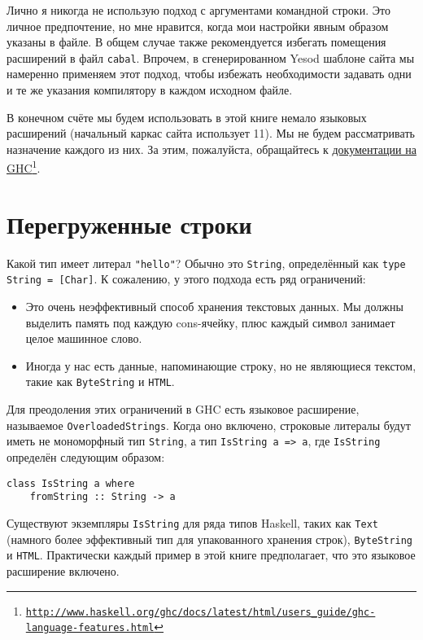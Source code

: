 Лично я никогда не использую подход с аргументами командной строки. Это личное предпочтение, но мне нравится, когда мои настройки явным образом указаны в файле. В общем случае также рекомендуется избегать помещения расширений в файл \texttt{cabal}. Впрочем, в сгенерированном Yesod шаблоне сайта  мы намеренно применяем этот подход, чтобы избежать необходимости задавать одни и те же указания компилятору в каждом исходном файле.

В конечном счёте мы будем использовать в этой книге немало языковых расширений (начальный каркас сайта использует 11). Мы не будем рассматривать назначение каждого из них. За этим, пожалуйста, обращайтесь к \href{http://www.haskell.org/ghc/docs/latest/html/users\_guide/ghc-language-features.html}{документации на GHC}\footnote{\href{http://www.haskell.org/ghc/docs/latest/html/users\_guide/ghc-language-features.html}{\texttt{http://www.haskell.org/ghc/docs/latest/html/users\_guide/ghc-language-features.html}}}.

\section{Перегруженные строки}

Какой тип имеет литерал \lstinline'"hello"'? Обычно это \lstinline'String', определённый как \lstinline'type String = [Char]'. К сожалению, у этого подхода есть ряд ограничений:
\begin{itemize}
\item Это очень неэффективный способ хранения текстовых данных. Мы должны выделить память под каждую cons-ячейку, плюс каждый символ занимает целое машинное слово.
\item Иногда у нас есть данные, напоминающие строку, но не являющиеся текстом, такие как \lstinline'ByteString' и \lstinline'HTML'.
\end{itemize}

Для преодоления этих ограничений в GHC есть языковое расширение, называемое \lstinline'OverloadedStrings'. Когда оно включено, строковые литералы будут иметь не мономорфный тип \lstinline'String', а тип \lstinline'IsString a => a', где \lstinline'IsString' определён следующим образом:

\begin{lstlisting}
class IsString a where
    fromString :: String -> a
\end{lstlisting}

Существуют экземпляры \lstinline'IsString' для ряда типов Haskell, таких как \lstinline'Text' (намного более эффективный тип для упакованного хранения строк), \lstinline'ByteString' и \lstinline'HTML'. Практически каждый пример в этой книге предполагает, что это языковое расширение включено.

